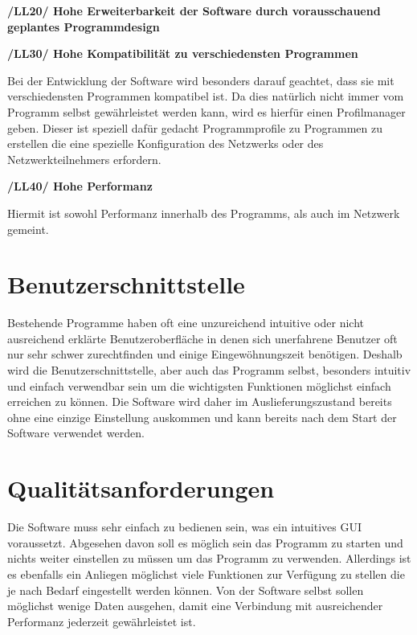 \documentclass[a4paper,12pt]{scrreprt}
\begin{document}
\textbf{/LL20/ Hohe Erweiterbarkeit der Software durch vorausschauend geplantes Programmdesign}
	
\textbf{/LL30/ Hohe Kompatibilität zu verschiedensten Programmen}
	
	Bei der Entwicklung der Software wird besonders darauf geachtet, dass sie mit verschiedensten Programmen kompatibel ist. Da dies natürlich nicht immer vom Programm selbst gewährleistet werden kann, wird es hierfür einen Profilmanager geben. Dieser ist speziell dafür gedacht Programmprofile zu Programmen zu erstellen die eine spezielle Konfiguration des Netzwerks oder des Netzwerkteilnehmers erfordern.
	
\textbf{/LL40/ Hohe Performanz}
	
	Hiermit ist sowohl Performanz innerhalb des Programms, als auch im Netzwerk gemeint.
	
	
	
	
\chapter{Benutzerschnittstelle}
	Bestehende Programme haben oft eine unzureichend intuitive oder nicht ausreichend erklärte Benutzeroberfläche in denen sich unerfahrene Benutzer oft nur sehr schwer zurechtfinden und einige Eingewöhnungszeit benötigen. Deshalb wird die Benutzerschnittstelle, aber auch das Programm selbst, besonders intuitiv und einfach verwendbar sein um die wichtigsten Funktionen möglichst einfach erreichen zu können. Die Software wird daher im Auslieferungszustand bereits ohne eine einzige Einstellung auskommen und kann bereits nach dem Start der Software verwendet werden.
	
	
	
\chapter{Qualitätsanforderungen}
Die Software muss sehr einfach zu bedienen sein, was ein intuitives GUI voraussetzt. Abgesehen davon soll es möglich sein das Programm zu starten und nichts weiter einstellen zu müssen um das Programm zu verwenden. Allerdings ist es ebenfalls ein Anliegen möglichst viele Funktionen zur Verfügung zu stellen die je nach Bedarf eingestellt werden können. Von der Software selbst sollen möglichst wenige Daten ausgehen, damit eine Verbindung mit ausreichender Performanz jederzeit gewährleistet ist.


	




	
	
\end{document}
